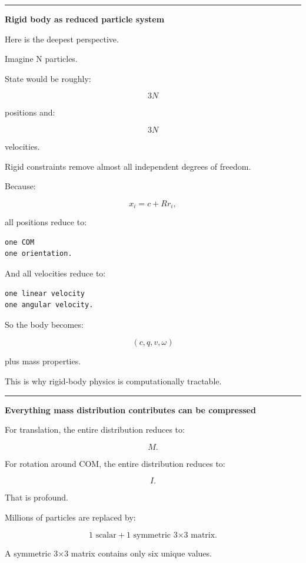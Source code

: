 \begin{center}\rule{0.5\linewidth}{0.5pt}\end{center}

\textbf{Rigid body as reduced particle system}

Here is the deepest perspective.

Imagine N particles.

State would be roughly:

\[
3N
\]

positions and:

\[
3N
\]

velocities.

Rigid constraints remove almost all independent degrees of freedom.

Because:

\[
x_i
=
c+
Rr_i,
\]

all positions reduce to:

\begin{verbatim}
one COM
one orientation.
\end{verbatim}

And all velocities reduce to:

\begin{verbatim}
one linear velocity
one angular velocity.
\end{verbatim}

So the body becomes:

\[
\boxed{
(c,q,v,\omega)
}
\]

plus mass properties.

This is why rigid-body physics is computationally tractable.

\begin{center}\rule{0.5\linewidth}{0.5pt}\end{center}

\textbf{Everything mass distribution contributes can be compressed}

For translation, the entire distribution reduces to:

\[
M.
\]

For rotation around COM, the entire distribution reduces to:

\[
I.
\]

That is profound.

Millions of particles are replaced by:

\[
1\text{ scalar}
+
1\text{ symmetric 3×3 matrix}.
\]

A symmetric 3×3 matrix contains only six unique values.

